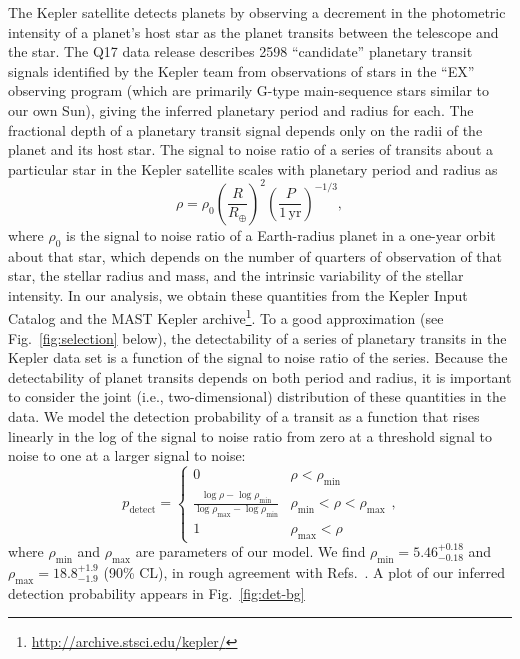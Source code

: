 \documentclass[12pt]{article}
\newcommand{\REarth}{R_\oplus}
\newcommand{\rhomin}{\rho_\mathrm{min}}
\newcommand{\rhomax}{\rho_\mathrm{max}}
\newcommand{\rhominrange}{5.46^{+0.18}_{-0.18}}
\newcommand{\rhomaxrange}{18.8^{+1.9}_{-1.9}}
\begin{document}
The Kepler satellite detects planets by observing a decrement in the
photometric intensity of a planet's host star as the planet transits
between the telescope and the star.  The Q17 data release describes
2598 ``candidate'' planetary transit signals identified by the Kepler
team from observations of stars in the ``EX'' observing program (which
are primarily G-type main-sequence stars similar to our own
Sun\cite{Batalha2010}), giving the inferred planetary period and
radius for each.  The fractional depth of a planetary transit signal
depends only on the radii of the planet and its host star.  The signal
to noise ratio of a series of transits about a particular star in the
Kepler satellite scales with planetary period and radius
as\cite{Chatterjee2012}
\begin{equation}
  \rho = \rho_0 \left( \frac{R}{\REarth} \right)^2 \left(
  \frac{P}{1\,\mathrm{yr}} \right)^{-1/3},
\end{equation}
where $\rho_0$ is the signal to noise ratio of a Earth-radius planet
in a one-year orbit about that star, which depends on the number of
quarters of observation of that star, the stellar radius and mass, and
the intrinsic variability of the stellar
intensity\cite{Christiansen2012}.  In our analysis, we obtain these
quantities from the Kepler Input Catalog\cite{Batalha2010,Brown2011}
and the MAST Kepler
archive\footnote{\url{http://archive.stsci.edu/kepler/}}.  To a good
approximation (see Fig.\ \ref{fig:selection} below), the detectability
of a series of planetary transits in the Kepler data set is a function
of the signal to noise ratio of the series.  Because the detectability
of planet transits depends on both period and radius, it is important
to consider the joint (i.e., two-dimensional) distribution of these
quantities in the data\cite{Tabachnik2002,Youdin2011}.  We model the
detection probability of a transit as a function that rises linearly
in the log of the signal to noise ratio from zero at a threshold
signal to noise to one at a larger signal to noise:
\begin{equation}
  \label{eq:pdetect}
  p_\mathrm{detect} = \begin{cases}
    0 & \rho < \rhomin \\
    \frac{\log \rho - \log \rhomin}{\log \rhomax - \log \rhomin} &
    \rhomin < \rho < \rhomax \\
    1 & \rhomax < \rho
  \end{cases},
\end{equation}
where $\rhomin$ and $\rhomax$ are parameters of our model.  We find
$\rhomin = \rhominrange$ and $\rhomax = \rhomaxrange$ (90\% CL), in
rough agreement with Refs.\ \cite{Borucki2011,Batalha2013}.  A plot of
our inferred detection probability appears in Fig.\ \ref{fig:det-bg}
\end{document}
